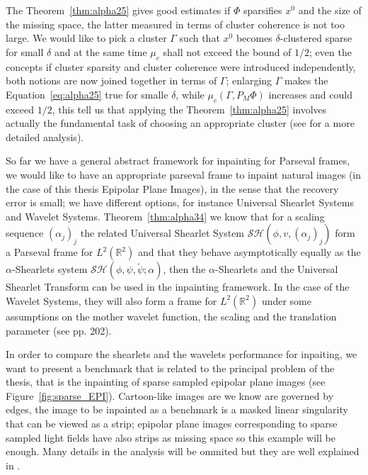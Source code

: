 \bigskip

The Theorem~\ref{thm:alpha25} gives good estimates if $\Phi$ sparsifies $x^0$ and the size of the missing space, the latter measured in terms of cluster coherence is not too large. We would like to pick a cluster $\Gamma$ such that $x^0$ becomes $\delta$-clustered sparse for small $\delta$ and at the same time $\mu_c$ shall not exceed the bound of $1/2$; even the concepts if cluster sparsity and cluster coherence were introduced independently, both notions are now joined together in terms of $\Gamma$; enlarging $\Gamma$ makes the Equation~\ref{eq:alpha25} true for smalle $\delta$, while $\mu_c(\Gamma,P_M\Phi)$ increases and could exceed $1/2$, this tell us that applying the Theorem~\ref{thm:alpha25} involves actually the fundamental task of choosing an appropriate cluster (see \cite{Firstinpaint} for a more detailed analysis). 

\bigskip

So far we have a general abstract framework for inpainting for Parseval frames, we would like to have an appropriate parseval frame to inpaint natural images (in the case of this thesis Epipolar Plane Images), in the sense that the recovery error is small; we have different options, for instance Universal Shearlet Systems and Wavelet Systems. Theorem~\ref{thm:alpha34} we know that for a scaling sequence $(\alpha_j)_j$ the related Universal Shearlet System $\mathcal{SH}(\phi,v,(\alpha_j)_j)$ form a Parseval frame for $L^2(\mathbb{R}^2)$ and that they behave asymptotically equally as the $\alpha$-Shearlets system $\mathcal{SH}(\phi,\psi,\tilde{\psi};\alpha)$, then the $\alpha$-Shearlets and the Universal Shearlet Transform can be used in the inpainting framework. In the case of the Wavelet Systems, they will also form a frame for $L^2(\mathbb{R}^2)$ under some assumptions on the mother wavelet function, the scaling and the translation parameter (see \cite{Mallat} pp. 202).

\bigskip

In order to compare the shearlets and the wavelets performance for inpaiting, we want to present a benchmark that is related to the principal problem of the thesis, that is the inpainting of sparse sampled epipolar plane images (see Figure~\ref{fig:sparse_EPI}). Cartoon-like images are we know are governed by edges, the image to be inpainted as a benchmark is a masked linear singularity that can be viewed as a strip; epipolar plane images corresponding to sparse sampled light fields have also strips as missing space so this example will be enough. Many details in the analysis will be ommited but they are well explained in \cite{Gitta-alpha}. 

